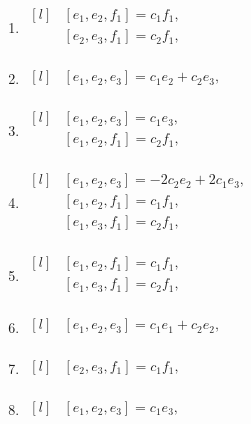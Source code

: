 \begin{adjustwidth*}{-0.5cm}{0cm}
\begin{multicols*}{2}
\begin{enumerate}
    \item $\begin{matrix*}[l]
            & [e_1, e_2, f_1] = c_{1} f_1, \\
            & [e_2, e_3, f_1] = c_{2} f_1, \\
        \end{matrix*}$

    \item $\begin{matrix*}[l]
            & [e_1, e_2, e_3] =  c_{1} e_2 + c_{2} e_3, \\
        \end{matrix*}$

    \item $\begin{matrix*}[l]
            & [e_1, e_2, e_3] =  c_{1} e_3, \\
            & [e_1, e_2, f_1] = c_{2} f_1, \\
        \end{matrix*}$

    \item $\begin{matrix*}[l]
            & [e_1, e_2, e_3] =  - 2 c_{2} e_2 + 2 c_{1} e_3, \\
            & [e_1, e_2, f_1] = c_{1} f_1, \\
            & [e_1, e_3, f_1] = c_{2} f_1, \\
        \end{matrix*}$

    \item $\begin{matrix*}[l]
            & [e_1, e_2, f_1] = c_{1} f_1, \\
            & [e_1, e_3, f_1] = c_{2} f_1, \\
        \end{matrix*}$

    \item $\begin{matrix*}[l]
            & [e_1, e_2, e_3] = c_{1} e_1 + c_{2} e_2 , \\
        \end{matrix*}$

    \item $\begin{matrix*}[l]
            & [e_2, e_3, f_1] = c_{1} f_1, \\
        \end{matrix*}$

    \item $\begin{matrix*}[l]
            & [e_1, e_2, e_3] =  c_{1} e_3, \\
        \end{matrix*}$


\end{enumerate}
\end{multicols*}
\end{adjustwidth*}
